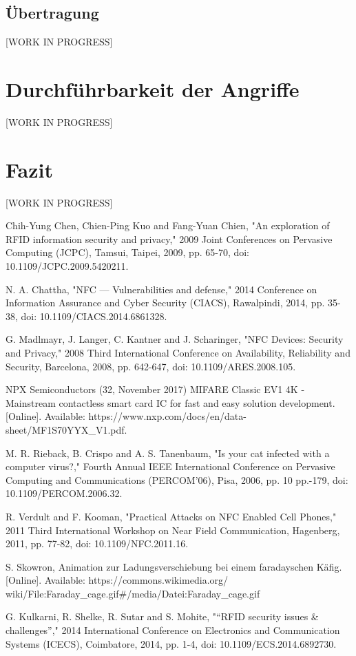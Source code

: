\documentclass[conference]{IEEEtran}
\begin{document}
\subsection{Übertragung}
[WORK IN PROGRESS]

\section{Durchführbarkeit der Angriffe}
[WORK IN PROGRESS]


\section{Fazit}
[WORK IN PROGRESS]


\begin{thebibliography}{00}
 Chih-Yung Chen, Chien-Ping Kuo and Fang-Yuan Chien, "An exploration of RFID information security and privacy," 2009 Joint Conferences on Pervasive Computing (JCPC), Tamsui, Taipei, 2009, pp. 65-70, doi: 10.1109/JCPC.2009.5420211.

 N. A. Chattha, "NFC — Vulnerabilities and defense," 2014 Conference on Information Assurance and Cyber Security (CIACS), Rawalpindi, 2014, pp. 35-38, doi: 10.1109/CIACS.2014.6861328.

 G. Madlmayr, J. Langer, C. Kantner and J. Scharinger, "NFC Devices: Security and Privacy," 2008 Third International Conference on Availability, Reliability and Security, Barcelona, 2008, pp. 642-647, doi: 10.1109/ARES.2008.105.

 NPX Semiconductors (32, November 2017) MIFARE Classic EV1 4K - Mainstream contactless smart card IC for fast and easy solution development. [Online]. Available: https://www.nxp.com/docs/en/data-sheet/MF1S70YYX\_V1.pdf.

 M. R. Rieback, B. Crispo and A. S. Tanenbaum, "Is your cat infected with a computer virus?," Fourth Annual IEEE International Conference on Pervasive Computing and Communications (PERCOM'06), Pisa, 2006, pp. 10 pp.-179, doi: 10.1109/PERCOM.2006.32.

 R. Verdult and F. Kooman, "Practical Attacks on NFC Enabled Cell Phones," 2011 Third International Workshop on Near Field Communication, Hagenberg, 2011, pp. 77-82, doi: 10.1109/NFC.2011.16.

 S. Skowron, Animation zur Ladungsverschiebung bei einem faradayschen Käfig. [Online]. Available: https://commons.wikimedia.org/ wiki/File:Faraday\_cage.gif\#/media/Datei:Faraday\_cage.gif

 G. Kulkarni, R. Shelke, R. Sutar and S. Mohite, "“RFID security issues \& challenges”," 2014 International Conference on Electronics and Communication Systems (ICECS), Coimbatore, 2014, pp. 1-4, doi: 10.1109/ECS.2014.6892730.

\end{thebibliography}
\end{document}

